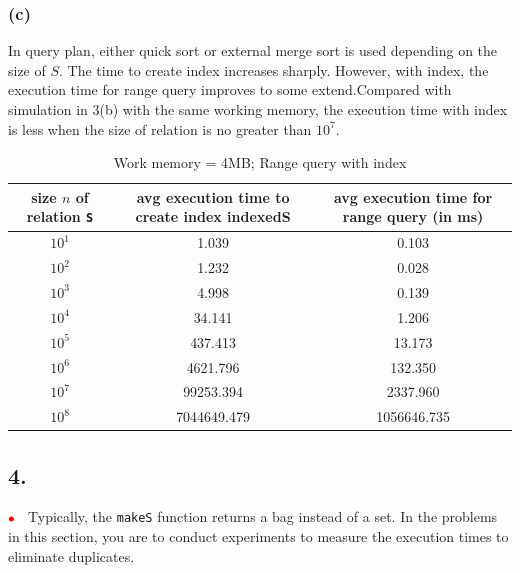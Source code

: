 \documentclass[10pt]{article}
\newcommand{\redbullet}{$\textcolor{red}{\bullet}$}
\begin{document}
\subsubsection*{(c)}
In query plan, either quick sort or external merge sort is used depending on the size of $S$. The time to create index increases sharply. However, with index, the execution time for range query improves to some extend.Compared with simulation in 3(b) with the same working memory, the execution time with index is less when the size of relation is no greater than $10^7$.
\begin{table}[H]
\begin{center}
\begin{tabular}{c|c|c}
size $n$ of relation {\tt S} & avg execution time to create index indexedS &avg execution time for range query (in ms) \\ \hline
$10^1$&1.039  &        0.103\\
$10^2$&1.232  &        0.028\\
$10^3$&4.998  &        0.139\\
$10^4$&34.141 &        1.206\\
$10^5$&437.413 &       13.173\\
$10^6$&4621.796 &      132.350\\
$10^7$&99253.394 &     2337.960\\
$10^8$&7044649.479 &  1056646.735\\
\end{tabular}
\caption{Work memory = 4MB; Range query with index}
\end{center}
\end{table}


\subsection*{4.}
\redbullet\ %
Typically, the {\tt makeS} function returns a bag instead of a set.   In the problems in this section, you are to conduct
experiments to measure the execution times to eliminate duplicates.   
\end{document}
